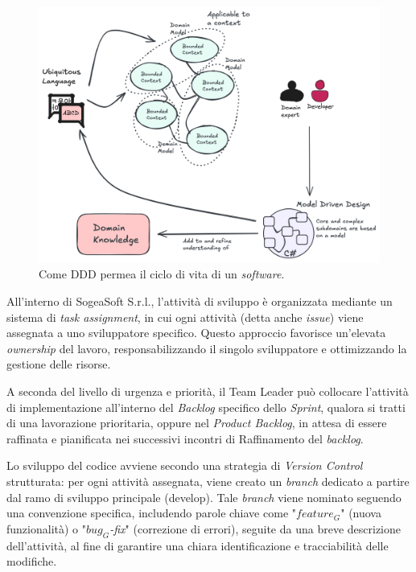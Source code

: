         \begin{figure}
            \centering
            \includegraphics[width=0.8\linewidth]{BCS-Tessi//images/DDD_CicloSoftware.png}
            \caption[Come DDD permea il ciclo di vita del \textit{software}]{Come DDD permea il ciclo di vita di un \textit{software}.}
            \label{fig:DDD-generale}
        \end{figure}
        
        
        \noindent All'interno di SogeaSoft S.r.l., l'attività di sviluppo è organizzata mediante un sistema di \textit{task assignment}, in cui ogni attività (detta anche \textit{issue}) viene assegnata a uno sviluppatore specifico. Questo approccio favorisce un’elevata \textit{ownership} del lavoro, responsabilizzando il singolo sviluppatore e ottimizzando la gestione delle risorse.

        \vspace{0.2 em}
        \noindent A seconda del livello di urgenza e priorità, il Team Leader può collocare l’attività di implementazione all’interno del \textit{Backlog} specifico dello \textit{Sprint}, qualora si tratti di una lavorazione prioritaria, oppure nel \textit{Product Backlog}, in attesa di essere raffinata e pianificata nei successivi incontri di Raffinamento del \textit{backlog}.

        \vspace{0.2 em}
        \noindent Lo sviluppo del codice avviene secondo una strategia di \textit{Version Control} strutturata: per ogni attività assegnata, viene creato un \textit{branch} dedicato a partire dal ramo di sviluppo principale (develop). Tale \textit{branch} viene nominato seguendo una convenzione specifica, includendo parole chiave come "\textit{$feature_G$}" (nuova funzionalità) o "\textit{$bug_G$-fix}" (correzione di errori), seguite da una breve descrizione dell’attività, al fine di garantire una chiara identificazione e tracciabilità delle modifiche.

